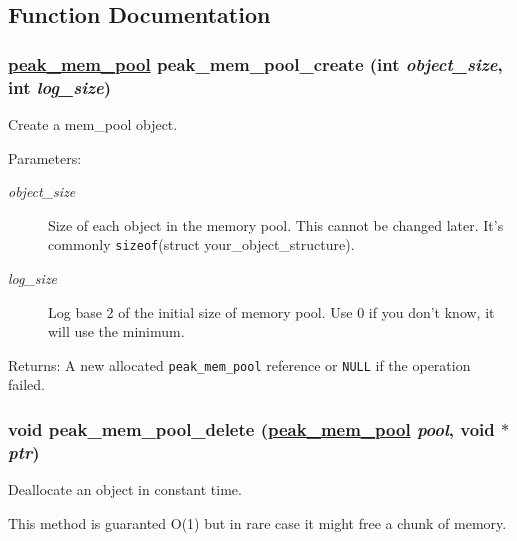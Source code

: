 \subsection{Function Documentation}
\hypertarget{group__mem__pool_ga1}{
\subsubsection[peak\_\-mem\_\-pool\_\-create]{\setlength{\rightskip}{0pt plus 5cm}\hyperlink{group__mem__pool_ga0}{peak\_\-mem\_\-pool} peak\_\-mem\_\-pool\_\-create (int {\em object\_\-size}, int {\em log\_\-size})}}
\label{group__mem__pool_ga1}


Create a mem\_\-pool object. 

\begin{Desc}
\item[Parameters:]
\begin{description}
\item[{\em object\_\-size}]Size of each object in the memory pool. This cannot be changed later. It's commonly {\tt sizeof}(struct your\_\-object\_\-structure). \item[{\em log\_\-size}]Log base 2 of the initial size of memory pool. Use 0 if you don't know, it will use the minimum.\end{description}
\end{Desc}
\begin{Desc}
\item[Returns:]A new allocated {\tt peak\_\-mem\_\-pool} reference or {\tt NULL} if the operation failed. \end{Desc}
\hypertarget{group__mem__pool_ga3}{
\subsubsection[peak\_\-mem\_\-pool\_\-delete]{\setlength{\rightskip}{0pt plus 5cm}void peak\_\-mem\_\-pool\_\-delete (\hyperlink{group__mem__pool_ga0}{peak\_\-mem\_\-pool} {\em pool}, void $\ast$ {\em ptr})}}
\label{group__mem__pool_ga3}


Deallocate an object in constant time. 

This method is guaranted O(1) but in rare case it might free a chunk of memory.

